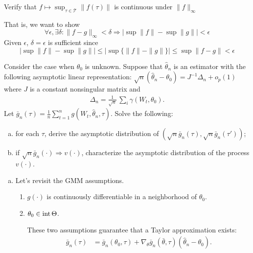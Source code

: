 \documentclass[11pt,letterpaper]{article}                  %
\begin{document}
\bigskip
\begin{problem}
Verify that $f \mapsto \sup_{\tau \in \mathcal{T}} \| f(\tau) \| $ is continuous
under $\|f\|_{\infty}$

That is, we want to show
\begin{equation*}
\forall \epsilon, \exists \delta : \|f-g\|_{\infty} < \delta
\Rightarrow  \bigl|\sup\|f\|-\sup\|g\| \bigr| < \epsilon
\end{equation*}
Given $\epsilon$, $\delta=\epsilon$ is sufficient since
\begin{equation*}
  \bigl|\sup\|f\|-\sup\|g\| \bigr| \le \bigl|\sup\{\|f\|-\|g\|\}
  \bigr| \le \sup\|f-g\| < \epsilon
\end{equation*}
\end{problem}

\bigskip
\begin{problem}
Consider the case when $\theta_0$ is unknown.
Suppose that $\hat{\theta}_n$ is an estimator with the following asymptotic linear representation:
$\sqrt{n} \left( \hat{\theta}_n - \theta_0 \right) = J^{-1} \Delta_n + o_p(1)$ where $J$ is a constant nonsingular matrix and
\begin{align*}
	\Delta_n = \frac{1}{\sqrt{n}} \, \sum_i \gamma (W_t, \theta_0).
\end{align*}
Let $\bar{g}_n (\tau) = \frac{1}{n} \sum_{t=1}^n g \left( W_t, \hat{\theta}_n, \tau \right)$.
Solve the following:
\begin{enumerate}[(a)]
	\item for each $\tau$, derive the asymptotic distribution of $(\sqrt{n} \bar{g}_n (\tau), \sqrt{n} \bar{g}_n (\tau'))$;
	\item if $\sqrt{n} \bar{g}_n (\cdot) \Rightarrow v(\cdot)$, characterize the asymptotic distribution of the process $v(\cdot)$.
\end{enumerate}

\medskip
\begin{enumerate}[(a)]
\item Let's revisit the GMM assumptions.

\begin{enumerate}[(1)]
	\item $g(\cdot)$ is continuously differentiable in a neighborhood of $\theta_0$.
	\item $\theta_0 \in {\rm int} \, \Theta$.

	These two assumptions guarantee that a Taylor approximation exists:
	\begin{align*}
		\bar{g}_n (\tau) &= \bar{g}_n (\theta_0, \tau) + \nabla_{\theta} \bar{g}_n (\bar{\theta}, \tau) (\hat{\theta}_n - \theta_0).
	\end{align*}


\end{enumerate}
\end{enumerate}
\end{problem}
\end{document}
